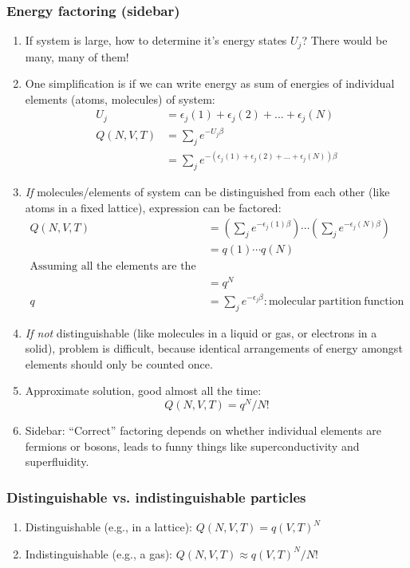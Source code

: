 \documentclass[11pt]{article}
\begin{document}
\subsubsection{Energy factoring (sidebar)}
\label{sec:org24e5ba0}
\begin{enumerate}
\item If system is large, how to determine it's energy states \(U_j\)?  There would be many, many of them!
\item One simplification is if we can write energy as sum of energies of individual elements (atoms, molecules) of system:
\begin{align}
  U_j&=\epsilon_j(1)+\epsilon_j(2) + ... + \epsilon_j(N) \\
  Q(N,V,T) &= \sum_j e^{-U_j\beta} \\
  &=\sum_je^{-(\epsilon_j(1)+\epsilon_j(2) + ... + \epsilon_j(N))\beta}
\end{align}
\item \emph{If} molecules/elements of system can be distinguished from each
other (like atoms in a fixed lattice), expression can be factored:
   \begin{align}
     Q(N,V,T)&=\left ( \sum_j e^{-\epsilon_j(1)\beta}\right )\cdots \left ( \sum_j
       e^{-\epsilon_j(N)\beta}\right ) \\
   &= q(1)\cdots q(N) \\
   \text{Assuming all the elements are the same:}\\
   &= q^N \\
  q&=\sum_j e^{-\epsilon_j \beta}: \mathrm{molecular\ partition\ function}
\end{align}
\item \emph{If not} distinguishable (like molecules in a liquid or gas, or electrons in a solid), problem is difficult, because identical
arrangements of energy amongst elements should only be counted once.
\item Approximate solution, good almost all the time:
\begin{equation}
  Q(N,V,T)=q^N/N!
\end{equation}
\item Sidebar: ``Correct'' factoring depends on whether individual elements are fermions or bosons, leads to funny things like superconductivity and superfluidity.
\end{enumerate}

\subsubsection{Distinguishable vs. indistinguishable particles}
\label{sec:orgdd89dd2}
\begin{enumerate}
\item Distinguishable (e.g., in a lattice): \(Q(N,V,T) = q(V,T)^N\)
\item Indistinguishable (e.g., a gas): \(Q(N,V,T)\approx q(V,T)^N/N!\)
\end{enumerate}
\end{document}
